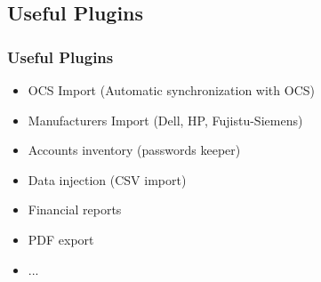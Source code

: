 \documentclass{beamer}
\begin{document}
\subsection{Useful Plugins}
\begin{frame}
\frametitle{Useful Plugins}
%
\begin{itemize}
%
\item OCS Import (Automatic synchronization with OCS)
\item Manufacturers Import (Dell, HP, Fujistu-Siemens)
\item Accounts inventory (passwords keeper)
\item Data injection (CSV import)
\item Financial reports
\item PDF export
\item ...
%
\end{itemize}
\end{frame}
%

\end{document}

